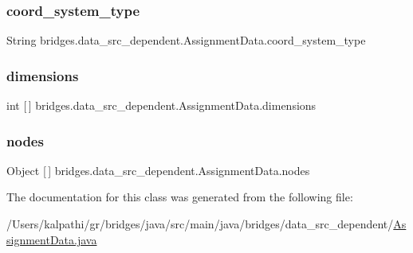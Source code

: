 \subsubsection{\texorpdfstring{coord\_system\_type}{coord\_system\_type}}
{\footnotesize\ttfamily String bridges.\+data\+\_\+src\+\_\+dependent.\+Assignment\+Data.\+coord\+\_\+system\+\_\+type}

\mbox{\label{classbridges_1_1data__src__dependent_1_1_assignment_data_ab4aa179a24395748542f6fb64307132c}} 
\subsubsection{\texorpdfstring{dimensions}{dimensions}}
{\footnotesize\ttfamily int \mbox{[}$\,$\mbox{]} bridges.\+data\+\_\+src\+\_\+dependent.\+Assignment\+Data.\+dimensions}

\mbox{\label{classbridges_1_1data__src__dependent_1_1_assignment_data_a1d7c23816a57cf9b3bd1bc0b53f15e8e}} 
\subsubsection{\texorpdfstring{nodes}{nodes}}
{\footnotesize\ttfamily Object \mbox{[}$\,$\mbox{]} bridges.\+data\+\_\+src\+\_\+dependent.\+Assignment\+Data.\+nodes}



The documentation for this class was generated from the following file\+:\begin{DoxyCompactItemize}
\item 
/\+Users/kalpathi/gr/bridges/java/src/main/java/bridges/data\+\_\+src\+\_\+dependent/\mbox{\hyperlink{_assignment_data_8java}{Assignment\+Data.\+java}}\end{DoxyCompactItemize}
